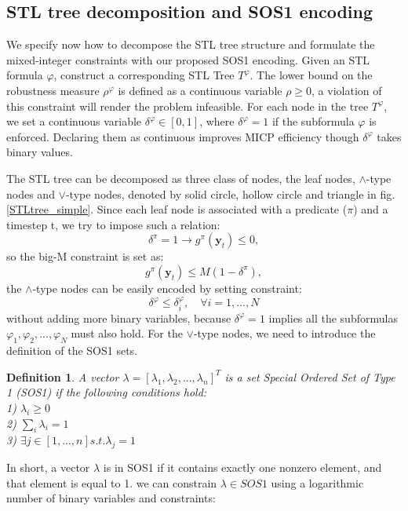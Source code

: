 \documentclass[a4paper]{report}
\newtheorem{myDef}{Definition}
\begin{document}
\subsection{STL tree decomposition and SOS1 encoding}
\label{STL_encooding}
We specify now how to decompose the STL tree structure and formulate the mixed-integer constraints with our proposed SOS1 encoding. Given an STL formula $\varphi$, construct a corresponding STL Tree $T^\varphi$. The lower bound on the robustness measure $\rho^\varphi$ is defined as a continuous variable $\rho\geq0$, a violation of this constraint will render the problem infeasible. For each node in the tree $T^\varphi$, we set a continuous variable $ \delta^\varphi \in [0,1]$, where $\delta^\varphi=1$ if the subformula $\varphi$ is enforced. Declaring them as continuous improves MICP efficiency though $\delta^\varphi$ takes binary values.

The STL tree can be decomposed as three class of nodes, the leaf nodes,  $\wedge $-type nodes and $\vee$-type nodes, denoted by solid circle, hollow circle and triangle in fig.\ref{STLtree_simple}. Since each leaf node is associated with a predicate ($\pi$) and a timestep t, we try to impose such a relation:
\begin{equation}
    \delta^\pi = 1 \rightarrow g^\pi(\boldsymbol{y}_t) \leq 0,
    \end{equation}
so the big-M constraint is set as:
\begin{equation}
    \label{sosconstraint1}
    g^\pi(\boldsymbol{y}_t) \leq M(1-\delta^\pi),
\end{equation}
the $\wedge $-type nodes can be easily encoded by setting constraint:
\begin{equation}
    \label{sosconstraint2}
    \delta^\varphi \leq  \delta^{\varphi}_i, \quad \forall i=1,...,N
\end{equation}
without adding more binary variables, because $\delta^\varphi = 1$ implies all the subformulas $\varphi_1, \varphi_2,..., \varphi_N $ must also hold. For the $\vee$-type nodes, we need to introduce the definition of the SOS1 sets.

\begin{myDef}
    A vector $\lambda = [\lambda_1,\lambda_2,...,\lambda_n]^T $ is a set Special Ordered Set of Type 1 (SOS1) if the following conditions hold:\\
    1) $\lambda_i \geq 0$\\
    2) $ \sum_{i} \lambda_i =1$\\
    3) $ \exists j \in [1,...,n] s.t. \lambda_j=1$\\
\end{myDef}
\vspace*{-0.5cm}
In short, a vector $\lambda$ is in SOS1 if it contains exactly one nonzero element, and that element is equal to 1. we can constrain $\lambda \in SOS1$ using a logarithmic number of binary variables and constraints:
\end{document}
